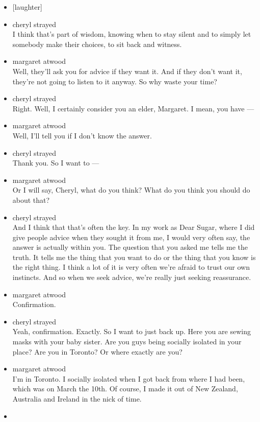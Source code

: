 \begin{itemize}
\item
  {[}laughter{]}
\item
  cheryl strayed\\
  I think that's part of wisdom, knowing when to stay silent and to
  simply let somebody make their choices, to sit back and witness.
\item
  margaret atwood\\
  Well, they'll ask you for advice if they want it. And if they don't
  want it, they're not going to listen to it anyway. So why waste your
  time?
\item
  cheryl strayed\\
  Right. Well, I certainly consider you an elder, Margaret. I mean, you
  have ---
\item
  margaret atwood\\
  Well, I'll tell you if I don't know the answer.
\item
  cheryl strayed\\
  Thank you. So I want to ---
\item
  margaret atwood\\
  Or I will say, Cheryl, what do you think? What do you think you should
  do about that?
\item
  cheryl strayed\\
  And I think that that's often the key. In my work as Dear Sugar, where
  I did give people advice when they sought it from me, I would very
  often say, the answer is actually within you. The question that you
  asked me tells me the truth. It tells me the thing that you want to do
  or the thing that you know is the right thing. I think a lot of it is
  very often we're afraid to trust our own instincts. And so when we
  seek advice, we're really just seeking reassurance.
\item
  margaret atwood\\
  Confirmation.
\item
  cheryl strayed\\
  Yeah, confirmation. Exactly. So I want to just back up. Here you are
  sewing masks with your baby sister. Are you guys being socially
  isolated in your place? Are you in Toronto? Or where exactly are you?
\item
  margaret atwood\\
  I'm in Toronto. I socially isolated when I got back from where I had
  been, which was on March the 10th. Of course, I made it out of New
  Zealand, Australia and Ireland in the nick of time.
\item

\end{itemize}

